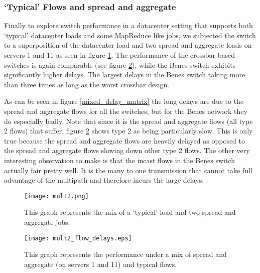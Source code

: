 \documentclass{IEEEtran}%
\begin{document}
\subsubsection{`Typical' Flows and spread and aggregate}
Finally to explore switch performance in a datacenter setting that supports both  `typical' datacenter loads and some MapReduce like jobs, we subjected the switch to a superposition of the datacenter load and two spread and aggregate loads on servers 1 and 11 as seen in figure \ref{typ_mult2}.  The performance of the crossbar based switches is again comparable (see figure \ref{typ_mult2_delays}), while the Benes switch exhibits significantly higher delays. The largest delays in the Benes switch taking more than three times as long as the worst crossbar design.

As can be seen in figure \ref{mixed_delay_matrix} the long delays are due to the spread and aggregate flows for all the switches, but for the Benes network they do especially badly.  Note that since it is the spread and aggregate flows (all type 2 flows) that suffer, figure \ref{typ_mult2_delays} shows type 2 as being particularly slow.  This is only true because the spread and aggregate flows are heavily delayed as opposed to the spread and aggregate flows slowing down other type 2 flows.  The other very interesting observation to make is that the incast flows in the Benes switch actually fair pretty well.  It is the many to one transmission that cannot take full advantage of the multipath and therefore incurs the large delays.
\begin{figure}%
	 \texttt{[image: mult2.png]}
	\caption{This graph represents the mix of a `typical' load and two spread and aggregate jobs.}
	\label{typ_mult2}
\end{figure}

\begin{figure}%
	 \texttt{[image: mult2\_flow\_delays.eps]}
	\caption{This graph represents the performance under a mix of spread and aggregate (on servers 1 and 11) and typical flows.}
	\label{typ_mult2_delays}
\end{figure}
\end{document}
